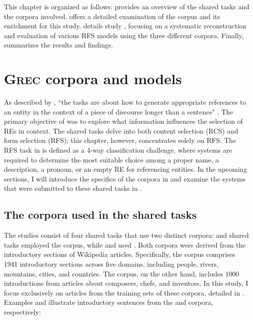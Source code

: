 This chapter is organized as follows:  provides an overview of the \grec shared tasks and the corpora involved.  offers a detailed examination of the \wsj corpus and its enrichment for this study.  details study \studA, focusing on a systematic reconstruction and evaluation of various RFS models using the three different corpora. Finally,  summarizes the results and findings.

\section{\textsc{Grec} corpora and models}\label{sec:grec}

As described by \citeauthor{belz2010generating}, ``the \grec tasks are about how to generate appropriate references to an entity in the context of a piece of discourse longer than a sentence" \citeyearpar[297]{belz2010generating}. The primary objective of \citeauthor{belz2010generating} was to explore what information influences the selection of REs in context. The \grec shared tasks delve into both content selection (RCS) and form selection (RFS); this chapter, however, concentrates solely on RFS. The RFS task in \grec is defined as a 4-way classification challenge, where systems are required to determine the most suitable choice among a proper name, a description, a pronoun, or an empty RE for referencing entities. In the upcoming sections, I will introduce the specifics of the \grec corpora in  and examine the systems that were submitted to these shared tasks in .

\subsection{The corpora used in the \grec shared tasks}\label{subsec:greccorpora}

The \grec studies consist of four shared tasks that use two distinct corpora: \grecmsreight and \grecmsrnine shared tasks employed the \grectwo corpus, while \grecnegnine and \grecnegten used \grecp. Both corpora were derived from the introductory sections of Wikipedia articles. Specifically, the \grectwo corpus comprises 1941 introductory sections across five domains, including people, rivers, mountains, cities, and countries. The \grecp corpus, on the other hand, includes 1000 introductions from articles about composers, chefs, and inventors. In this study, I focus exclusively on articles from the training sets of these corpora, detailed in . Examples  and  illustrate introductory sentences from the \msrcor and \negcor corpora, respectively:


